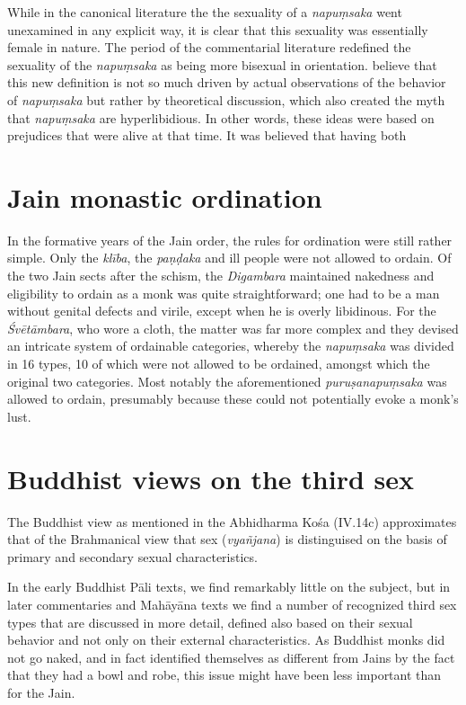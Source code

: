 While in the canonical literature the the sexuality of a {\em napuṃsaka} went unexamined in any explicit way, it is clear that this sexuality was essentially female in nature. The period of the commentarial literature redefined the sexuality of the {\em napuṃsaka} as being more bisexual in orientation. \cite{zwilling} believe that this new definition is not so much driven by actual observations of the behavior of {\em napuṃsaka} but rather by theoretical discussion, which also created the myth that {\em napuṃsaka} are hyperlibidious. In other words, these ideas were based on prejudices that were alive at that time. It was believed that having both 


\section{Jain monastic ordination}
In the formative years of the Jain order, the rules for ordination were still rather simple. Only the {\em klība}, the {\em paṇḍaka} and ill people were not allowed to ordain. Of the two Jain sects after the schism, the {\em Digambara} maintained nakedness and eligibility to ordain as a monk was quite straightforward; one had to be a man without genital defects and virile, except when he is overly libidinous. For the {\em Śvētāmbara}, who wore a cloth, the matter was far more complex and they devised an intricate system of ordainable categories, whereby the {\em napuṃsaka} was divided in 16 types, 10 of which were not allowed to be ordained, amongst which the original two categories. Most notably the aforementioned {\em puruṣanapuṃsaka} was allowed to ordain, presumably because these could not potentially evoke a monk's lust.


\section{Buddhist views on the third sex}
The Buddhist view as mentioned in the Abhidharma Kośa (IV.14c) approximates that of the Brahmanical view that sex ({\em vyañjana}) is distinguised on the basis of primary and secondary sexual characteristics.

In the early Buddhist Pāli texts, we find remarkably little on the subject, but in later commentaries and Mahāyāna texts we find a number of recognized third sex types that are discussed in more detail, defined also based on their sexual behavior and not only on their external characteristics. As Buddhist monks did not go naked, and in fact identified themselves as different from Jains by the fact that they had a bowl and robe, this issue might have been less important than for the Jain.


